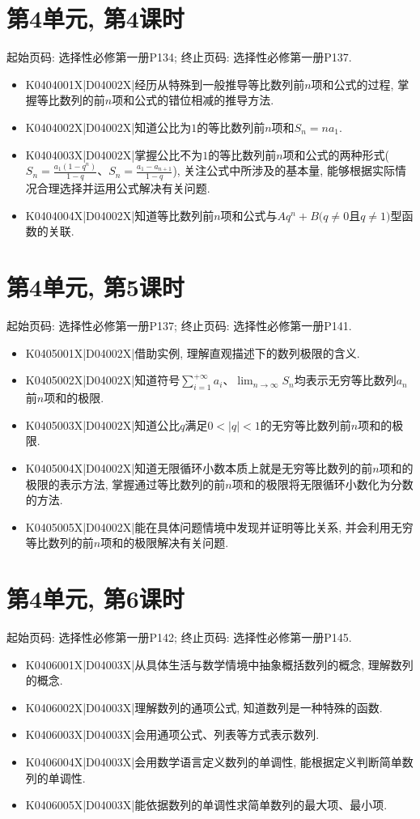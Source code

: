 \section*{第4单元, 第4课时}
起始页码: 选择性必修第一册P134; 终止页码: 选择性必修第一册P137.
\begin{itemize}
\item K0404001X|D04002X|经历从特殊到一般推导等比数列前$n$项和公式的过程, 掌握等比数列的前$n$项和公式的错位相减的推导方法.
\item K0404002X|D04002X|知道公比为$1$的等比数列前$n$项和$S_{n}=na_{1}$.
\item K0404003X|D04002X|掌握公比不为$1$的等比数列前$n$项和公式的两种形式($S_{n}=\frac{a_{1}(1-q^{n})}{1-q}$、$S_{n}=\frac{a_{1}-a_{n+1}}{1-q}$), 关注公式中所涉及的基本量, 能够根据实际情况合理选择并运用公式解决有关问题.
\item K0404004X|D04002X|知道等比数列前$n$项和公式与$Aq^n+B(q\neq 0$且$q\neq 1)$型函数的关联.
\end{itemize}

\section*{第4单元, 第5课时}
起始页码: 选择性必修第一册P137; 终止页码: 选择性必修第一册P141.
\begin{itemize}
\item K0405001X|D04002X|借助实例, 理解直观描述下的数列极限的含义.
\item K0405002X|D04002X|知道符号$\sum\limits_{i=1}^{+\infty }{a_i}$、$\displaystyle\lim_{n\to \infty}S_n$均表示无穷等比数列${a_n}$前$n$项和的极限.
\item K0405003X|D04002X|知道公比$q$满足$0<|q|<1$的无穷等比数列前$n$项和的极限.
\item K0405004X|D04002X|知道无限循环小数本质上就是无穷等比数列的前$n$项和的极限的表示方法, 掌握通过等比数列的前$n$项和的极限将无限循环小数化为分数的方法.
\item K0405005X|D04002X|能在具体问题情境中发现并证明等比关系, 并会利用无穷等比数列的前$n$项和的极限解决有关问题.
\end{itemize}

\section*{第4单元, 第6课时}
起始页码: 选择性必修第一册P142; 终止页码: 选择性必修第一册P145.
\begin{itemize}
\item K0406001X|D04003X|从具体生活与数学情境中抽象概括数列的概念, 理解数列的概念.
\item K0406002X|D04003X|理解数列的通项公式, 知道数列是一种特殊的函数.
\item K0406003X|D04003X|会用通项公式、列表等方式表示数列.
\item K0406004X|D04003X|会用数学语言定义数列的单调性, 能根据定义判断简单数列的单调性.
\item K0406005X|D04003X|能依据数列的单调性求简单数列的最大项、最小项.
\end{itemize}

